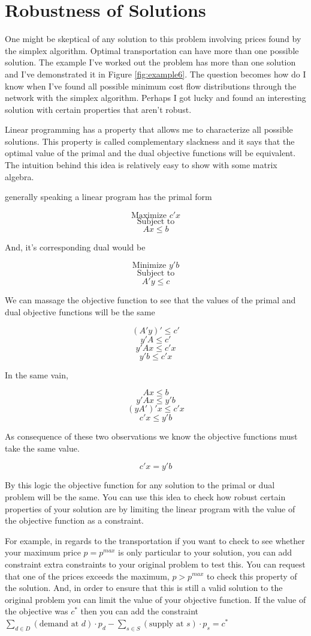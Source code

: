 \documentclass{report}
\begin{document}
\section{Robustness of Solutions}

One might be skeptical of any solution to this problem involving prices found by the simplex algorithm. Optimal transportation can have more than one possible solution. The example I've worked out the problem  has more than one solution and I've demonstrated it in Figure \ref{fig:example6}. The question becomes how do I know when I've found all possible minimum cost flow distributions through the network with the simplex algorithm. Perhaps I got lucky and found an interesting solution with certain properties that aren't robust.

Linear programming has a property that allows me to characterize all possible solutions. This property is called complementary slackness and it says that the optimal value of the primal and the dual objective functions will be equivalent. The intuition behind this idea is relatively easy to show with some matrix algebra.

 generally speaking a linear program has the primal form

$$\text{Maximize } c' x$$
$$\text{Subject to}$$
$$Ax \leq b$$

And, it's corresponding dual would be

$$\text{Minimize } y' b$$
$$\text{Subject to}$$
$$A'y \leq c$$

We can massage the objective function to see that the values of the primal and dual objective functions will be the same

$$(A'y)' \leq c'$$
$$ y'A \leq c'$$
$$ y'Ax \leq c'x$$
$$y' b \leq c'x$$

In the same vain, 

$$ Ax \leq b$$
$$ y'Ax \leq y'b$$
$$ (yA')'x \leq c'x$$
$$ c'x \leq  y' b $$

As consequence of these two observations we know the objective functions must take the same value.

$$c'x = y' b$$

By this logic the objective function for any solution to the primal or dual problem will be the same. You can use this idea to check how robust certain properties of your solution are by limiting the linear program with the value of the objective function as a constraint. 

For example, in regards to the transportation if you want to check to see whether your maximum price $p = p^{max}$ is only particular to your solution, you can add constraint extra constraints to your original problem to test this. You can request that one of the prices exceeds the maximum, $p > p^{max}$ to check this property of the solution. And, in order to ensure that this is still a valid solution to the original problem you can limit the value of your objective function. If the value of the objective was $c^*$ then you can add the constraint  $ \sum_{d \in D}  (\text{demand at } d) \cdot p_{d} -   \sum_{s \in S}  (\text{supply at } s) \cdot p_{s} = c^*$
\end{document}
